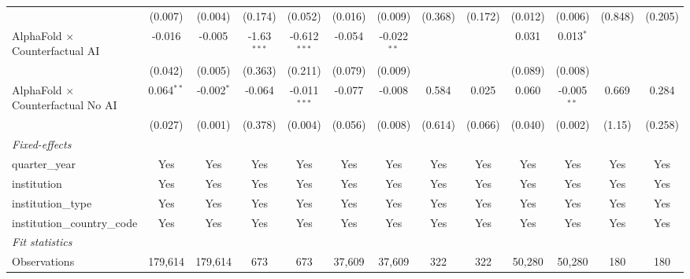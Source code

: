 \begin{tabular}{lcccccccccccc}
                                            & (0.007)       & (0.004)       & (0.174)       & (0.052)        & (0.016)       & (0.009)       & (0.368)     & (0.172) & (0.012)       & (0.006)       & (0.848) & (0.205)\\   
   AlphaFold $\times$ Counterfactual AI     & -0.016        & -0.005        & -1.63$^{***}$ & -0.612$^{***}$ & -0.054        & -0.022$^{**}$ &             &         & 0.031         & 0.013$^{*}$   &         &   \\   
                                            & (0.042)       & (0.005)       & (0.363)       & (0.211)        & (0.079)       & (0.009)       &             &         & (0.089)       & (0.008)       &         &   \\   
   AlphaFold $\times$ Counterfactual No AI  & 0.064$^{**}$  & -0.002$^{*}$  & -0.064        & -0.011$^{***}$ & -0.077        & -0.008        & 0.584       & 0.025   & 0.060         & -0.005$^{**}$ & 0.669   & 0.284\\   
                                            & (0.027)       & (0.001)       & (0.378)       & (0.004)        & (0.056)       & (0.008)       & (0.614)     & (0.066) & (0.040)       & (0.002)       & (1.15)  & (0.258)\\   
   \midrule
   \emph{Fixed-effects}\\
   quarter\_year                            & Yes           & Yes           & Yes           & Yes            & Yes           & Yes           & Yes         & Yes     & Yes           & Yes           & Yes     & Yes\\  
   institution                              & Yes           & Yes           & Yes           & Yes            & Yes           & Yes           & Yes         & Yes     & Yes           & Yes           & Yes     & Yes\\  
   institution\_type                        & Yes           & Yes           & Yes           & Yes            & Yes           & Yes           & Yes         & Yes     & Yes           & Yes           & Yes     & Yes\\  
   institution\_country\_code               & Yes           & Yes           & Yes           & Yes            & Yes           & Yes           & Yes         & Yes     & Yes           & Yes           & Yes     & Yes\\  
   \midrule
   \emph{Fit statistics}\\
   Observations                             & 179,614       & 179,614       & 673           & 673            & 37,609        & 37,609        & 322         & 322     & 50,280        & 50,280        & 180     & 180\\  

\end{tabular}

